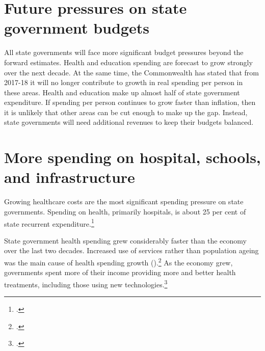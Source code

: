 \section{Future pressures on state government budgets\label{sec:FISCAL-4-1}}
All state governments will face more significant budget pressures beyond the forward estimates. Health and education spending are forecast to grow strongly over the next decade. At the same time, the Commonwealth has stated that from 2017-18 it will no longer contribute to growth in real spending per person in these areas. Health and education make up almost half of state government expenditure. If spending per person continues to grow faster than inflation, then it is unlikely that other areas can be cut enough to make up the gap. Instead, state governments will need additional revenues to keep their budgets balanced.

\section{More spending on hospital, schools, and infrastructure\label{sec:FISCAL-4-2}}
Growing healthcare costs are the most significant spending pressure on state governments. Spending on health, primarily hospitals, is about 25 per cent of state recurrent expenditure.\footcite[][4]{DaleyMcGannonHunter2014}

State government health spending grew considerably faster than the economy over the last two decades. Increased use of services rather than population ageing was the main cause of health spending growth ().\footcite[][26]{DaleyWoodWeidmannEtAl2014}  As the economy grew, governments spent more of their income providing more and better health treatments, including those using new technologies.\footcite{gruen2007conceptual}

